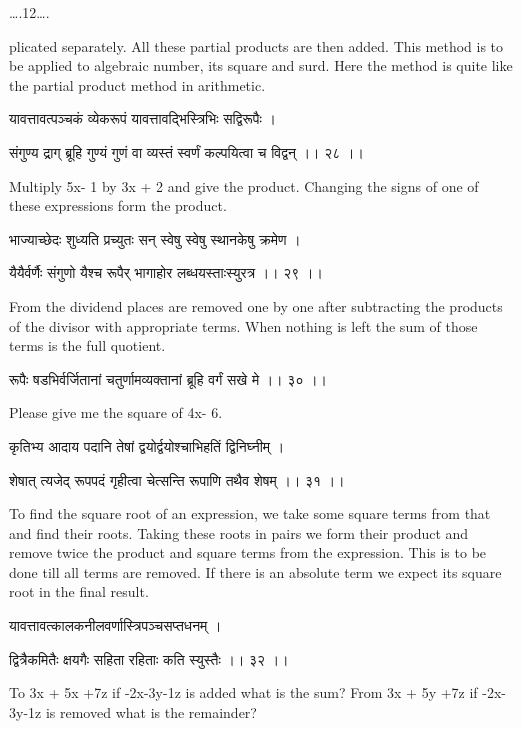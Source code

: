 \documentclass[]{article}
\date{}
\begin{document}
{\ldots{}.12\ldots{}.}

{plicated separately. All these partial products are then added. This
method is to be applied to algebraic number, its square and surd. Here
the method is quite like the partial product method in arithmetic.}

{यावत्तावत्पञ्चकं व्येकरूपं यावत्तावद्भिस्त्रिभिः सद्विरूपैः । }

{संगुण्य द्राग् ब्रूहि गुण्यं गुणं वा व्यस्तं स्वर्णं कल्पयित्वा च
विद्वन् ।। २८ ।। }

{Multiply 5x- 1 by 3x + 2 and give the product. Changing the signs of
one of these expressions form the product.}

{भाज्याच्छेदः शुध्यति प्रच्युतः सन् स्वेषु स्वेषु स्थानकेषु क्रमेण । }

{यैयैर्वर्णैः संगुणो यैश्च रूपैर् भागाहोर लब्धयस्ताःस्युरत्र ।। २९ ।। }

{From the dividend places are removed one by one after subtracting the
products of the divisor with appropriate terms. When nothing is left the
sum of those terms is the full quotient.}

{रूपैः षडभिर्वर्जितानां चतुर्णामव्यक्तानां ब्रूहि वर्गं सखे मे ।। ३० ।।
}

{Please give me the square of 4x- 6.}

{कृतिभ्य आदाय पदानि तेषां द्वयोर्द्वयोश्चाभिहतिं द्विनिघ्नीम् । }

{शेषात् त्यजेद् रूपपदं गृहीत्वा चेत्सन्ति रूपाणि तथैव शेषम् ।। ३१ ।। }

{To find the square root of an expression, we take some square terms
from that and find their roots. Taking these roots in pairs we form
their product and remove twice the product and square terms from the
expression. This is to be done till all terms are removed. If there is
an absolute term we expect its square root in the final result.}

{यावत्तावत्कालकनीलवर्णास्त्रिपञ्चसप्तधनम् । }

{द्वित्रैकमितैः क्षयगैः सहिता रहिताः कति स्युस्तैः ।। ३२ ।। }

{To 3x + 5x +7z if -2x-3y-1z is added what is the sum? From 3x + 5y +7z
if -2x-3y-1z is removed what is the remainder?\\
}
\end{document}

